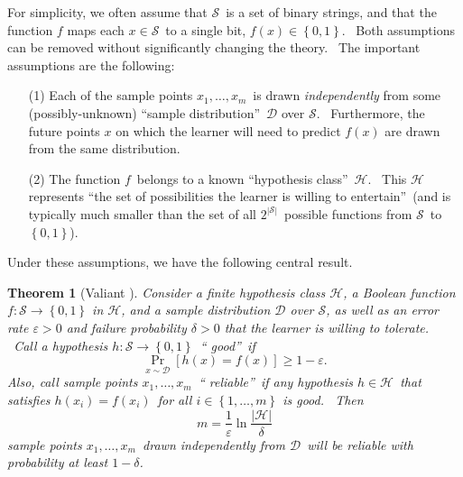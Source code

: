 \documentclass[12pt,onecolumn]{article}%
\newtheorem{theorem}{Theorem}
\begin{document}
For simplicity, we often assume that $\mathcal{S}$\ is a set of binary
strings, and that the function $f$ maps each $x\in\mathcal{S}$\ to a single
bit, $f\left(  x\right)  \in\left\{  0,1\right\}  $. \ Both assumptions can be
removed without significantly changing the theory. \ The important assumptions
are the following:

\begin{enumerate}
\item[(1)] Each of the sample points $x_{1},\ldots,x_{m}$\ is drawn
\textit{independently} from some (possibly-unknown) \textquotedblleft sample
distribution\textquotedblright\ $\mathcal{D}$ over $\mathcal{S}$.
\ Furthermore, the future points $x$ on which the learner will need to predict
$f\left(  x\right)  $ are drawn from the same distribution.

\item[(2)] The function $f$\ belongs to a known \textquotedblleft hypothesis
class\textquotedblright\ $\mathcal{H}$. \ This $\mathcal{H}$ represents
\textquotedblleft the set of possibilities the learner is willing to
entertain\textquotedblright\ (and is typically much smaller than the set of
all $2^{\left\vert \mathcal{S}\right\vert }$\ possible functions from
$\mathcal{S}$\ to $\left\{  0,1\right\}  $).
\end{enumerate}

Under these assumptions, we have the following central result.

\begin{theorem}
[Valiant \cite{valiant:pac}]\label{valthm}Consider a finite hypothesis class
$\mathcal{H}$, a Boolean function $f:\mathcal{S}\rightarrow\left\{
0,1\right\}  $ in $\mathcal{H}$, and a sample distribution $\mathcal{D}$ over
$\mathcal{S}$, as well as an error rate $\varepsilon>0$ and failure
probability $\delta>0$ that the learner is willing to tolerate. \ Call a
hypothesis $h:\mathcal{S}\rightarrow\left\{  0,1\right\}  $\ \textquotedblleft
good\textquotedblright\ if%
\[
\Pr_{x\sim\mathcal{D}}\left[  h\left(  x\right)  =f\left(  x\right)  \right]
\geq1-\varepsilon.
\]
Also, call sample points $x_{1},\ldots,x_{m}$\ \textquotedblleft
reliable\textquotedblright\ if any hypothesis $h\in\mathcal{H}$\ that
satisfies $h\left(  x_{i}\right)  =f\left(  x_{i}\right)  $\ for all
$i\in\left\{  1,\ldots,m\right\}  $ is good. \ Then%
\[
m=\frac{1}{\varepsilon}\ln\frac{\left\vert \mathcal{H}\right\vert }{\delta}%
\]
sample points $x_{1},\ldots,x_{m}$\ drawn independently from $\mathcal{D}%
$\ will be reliable with probability at least $1-\delta$.
\end{theorem}
\end{document}
